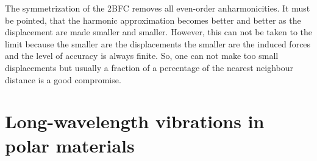 

The symmetrization of the 2BFC removes all even-order anharmonicities. It must be pointed, that the harmonic 
approximation becomes better and better as the displacement are made smaller and smaller. However, this can 
not be taken to the limit because the smaller are the displacements the smaller are the induced forces and the level 
of accuracy is always finite. So, one can not make too small displacements but usually a fraction of a percentage of 
the nearest neighbour distance is a good compromise. \\

\section{Long-wavelength vibrations in polar materials}


